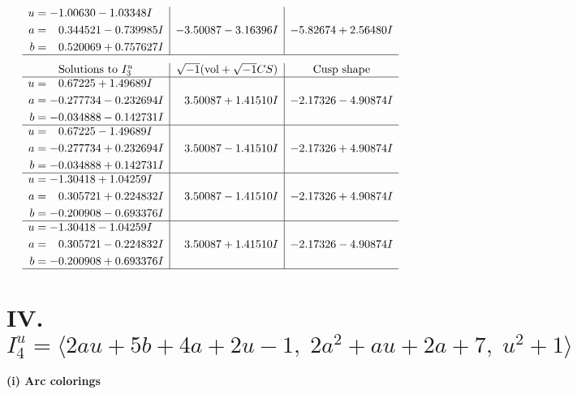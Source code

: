 \documentclass[1p]{elsarticle_modified}
\theoremstyle{definition}
\newcommand{\I}{\sqrt{-1}}
\begin{document}
$$\begin{array}{c|c|c}
\begin{aligned}
u &= -1.00630 - 1.03348 I \\
a &= \phantom{-}0.344521 - 0.739985 I \\
b &= \phantom{-}0.520069 + 0.757627 I\end{aligned}
 & -3.50087 - 3.16396 I & -5.82674 + 2.56480 I\\
 \hline 
 \end{array}$$\newpage$$\begin{array}{c|c|c}  
\text{Solutions to }I^u_{3}& \I (\text{vol} + \sqrt{-1}CS) & \text{Cusp shape}\\
 \hline 
\begin{aligned}
u &= \phantom{-}0.67225 + 1.49689 I \\
a &= -0.277734 - 0.232694 I \\
b &= -0.034888 - 0.142731 I\end{aligned}
 & \phantom{-}3.50087 + 1.41510 I & -2.17326 - 4.90874 I \\ \hline\begin{aligned}
u &= \phantom{-}0.67225 - 1.49689 I \\
a &= -0.277734 + 0.232694 I \\
b &= -0.034888 + 0.142731 I\end{aligned}
 & \phantom{-}3.50087 - 1.41510 I & -2.17326 + 4.90874 I \\ \hline\begin{aligned}
u &= -1.30418 + 1.04259 I \\
a &= \phantom{-}0.305721 + 0.224832 I \\
b &= -0.200908 - 0.693376 I\end{aligned}
 & \phantom{-}3.50087 - 1.41510 I & -2.17326 + 4.90874 I \\ \hline\begin{aligned}
u &= -1.30418 - 1.04259 I \\
a &= \phantom{-}0.305721 - 0.224832 I \\
b &= -0.200908 + 0.693376 I\end{aligned}
 & \phantom{-}3.50087 + 1.41510 I & -2.17326 - 4.90874 I\\
 \hline 
 \end{array}$$\newpage\newpage\renewcommand{\arraystretch}{1}
\centering \section*{IV. $I^u_{4}= \langle 2 a u+5 b+4 a+2 u-1,\;2 a^2+a u+2 a+7,\;u^2+1 \rangle$}
\flushleft \textbf{(i) Arc colorings}\\
\end{document}
